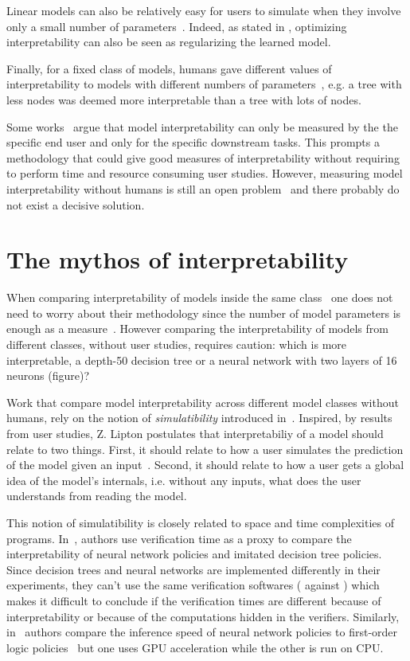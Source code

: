 Linear models can also be relatively easy for users to simulate when they involve only a small number of parameters~\citep{study-4}.
Indeed, as stated in \citep{study-0}, optimizing interpretability can also be seen as regularizing the learned model. 

Finally, for a fixed class of models, humans gave different values of interpretability to models with different numbers of parameters~\citep{study-4}, e.g. a tree with less nodes was deemed more interpretable than a tree with lots of nodes.

Some works~\cite{lipton,rigourous} argue that model interpretability can only be measured by the the specific end user and only for the specific downstream tasks.
This prompts a methodology that could give good measures of interpretability without requiring to perform time and resource consuming user studies.
However, measuring model interpretability without humans is still an open problem~\cite{glanois-survey} and there probably do not exist a decisive solution.

\section{The mythos of interpretability}\label{res:lipton}
When comparing interpretability of models inside the same class~\cite{murtree,blosson,pystreed,vanderlinden2024optimalgreedydecisiontrees,sympol,viper,topin2021iterative} one does not need to worry about their methodology since the number of model parameters is enough as a measure~\cite{study-4}.
However comparing the interpretability of models from different classes, without user studies, requires caution: which is more interpretable, a depth-50 decision tree or a neural network with two layers of 16 neurons (figure)?

Work that compare model interpretability across different model classes without humans, rely on the notion of \textit{simulatibility} introduced in~\cite{lipton}.
Inspired, by results from user studies, Z. Lipton postulates that interpretabiliy of a model should relate to two things.
First, it should relate to how a user simulates the prediction of the model given an input~\cite{study-6,study-5}.
Second, it should relate to how a user gets a global idea of the model's internals, i.e. without any inputs, what does the user understands from reading the model.

This notion of simulatibility is closely related to space and time complexities of programs.
In~\cite{viper}, authors use verification time as a proxy to compare the interpretability of neural network policies and imitated decision tree policies.
Since decision trees and neural networks are implemented differently in their experiments, they can't use the same verification softwares (\cite{z3} against \cite{maraboupy}) which makes it difficult to conclude if the verification times are different because of interpretability or because of the computations hidden in the verifiers.
Similarly, in~\cite{insight} authors compare the inference speed of neural network policies to first-order logic policies~\cite{nduge} but one uses GPU acceleration while the other is run on CPU.

